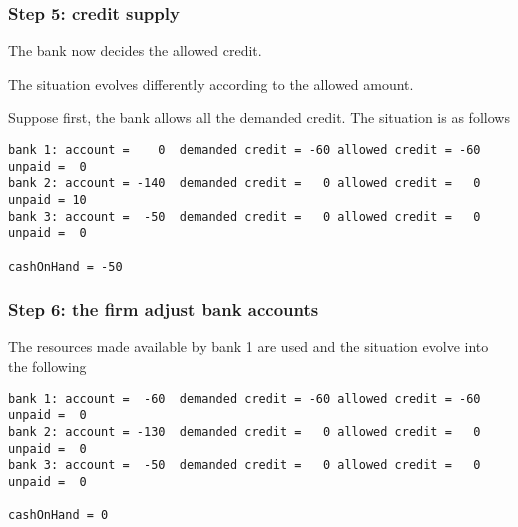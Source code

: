 \documentclass[a4paper]{article}
\begin{document}
\subsubsection*{Step 5: credit supply}

The bank now decides the allowed credit.

The situation evolves differently according to the allowed amount.

Suppose first, the bank allows all the demanded credit. The situation is as follows

\begin{verbatim}
bank 1: account =    0  demanded credit = -60 allowed credit = -60 unpaid =  0
bank 2: account = -140  demanded credit =   0 allowed credit =   0 unpaid = 10
bank 3: account =  -50  demanded credit =   0 allowed credit =   0 unpaid =  0

cashOnHand = -50
\end{verbatim}

\subsubsection*{Step 6: the firm adjust bank accounts}

The resources made available by bank 1 are used and the situation evolve into the following

\begin{verbatim}
bank 1: account =  -60  demanded credit = -60 allowed credit = -60 unpaid =  0
bank 2: account = -130  demanded credit =   0 allowed credit =   0 unpaid =  0
bank 3: account =  -50  demanded credit =   0 allowed credit =   0 unpaid =  0

cashOnHand = 0
\end{verbatim}
\end{document}
